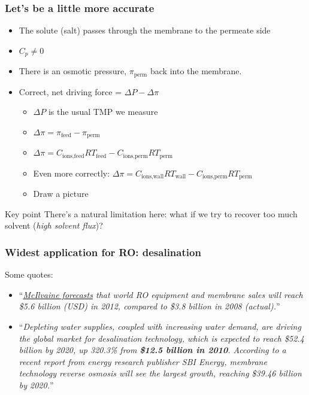 \begin{frame}\frametitle{Let's be a little more accurate}
	\begin{itemize}
		\item	The solute (salt) passes through the membrane to the permeate side
		\item	$C_p \neq 0$
		\item	There is an osmotic pressure, $\pi_\text{perm}$ back into the membrane.
		\item	Correct, net driving force = $\Delta P - \Delta \pi$
		\begin{itemize}
			\item	$\Delta P$ is the usual TMP we measure
			\item	$\Delta \pi = \pi_\text{feed} - \pi_\text{perm}$
			\item	$\Delta \pi = C_\text{ions,feed}RT_\text{feed} - C_\text{ions,perm}RT_\text{perm}$
			\item	Even more correctly: $\Delta \pi = C_\text{ions,wall}RT_\text{wall} - C_\text{ions,perm}RT_\text{perm}$
			\item	{\color{myOrange}Draw a picture}
		\end{itemize}
	\end{itemize}
	
	\vspace{12pt}
	\begin{exampleblock}{Key point}
		There's a natural limitation here: what if we try to recover too much solvent (\emph{high solvent flux})?
	\end{exampleblock}
\end{frame}

\begin{frame}\frametitle{Widest application for RO: desalination}
	Some quotes:
	\begin{itemize}
		\item	``\emph{\href{http://www.sciencedirect.com/science/article/pii/S0958211809701053}{McIlvaine forecasts} that world RO equipment and membrane sales will reach \$5.6 billion (USD) in 2012, compared to \$3.8 billion in 2008 (actual).}''
		\item	``\emph{Depleting water supplies, coupled with increasing water demand, are driving the global market for desalination technology, which is expected to reach \$52.4 billion by 2020, up 320.3\% from \textbf{\$12.5 billion in 2010}. According to a recent report from energy research publisher SBI Energy, membrane technology reverse osmosis will see the largest growth, reaching \$39.46 billion by 2020.}''
	\end{itemize}
\end{frame}

